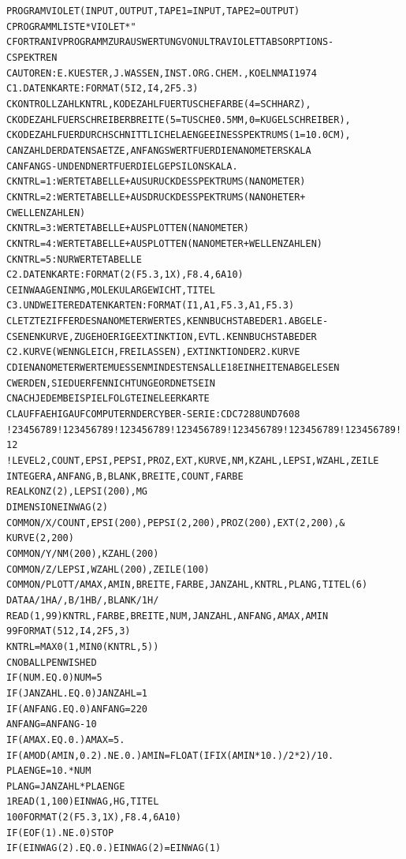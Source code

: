 \documentclass[a4paper,11pt]{article}
\begin{document}
\begin{alltt}
      PROGRAM VIOLET (INPUT,OUTPUT,TAPE1=INPUT,TAPE2=OUTPUT)
C     PROGRAMMLISTE *VIOLET* "
C     FORTRAN IV PROGRAMM ZUR AUSWERTUNG VON ULTRAVIOLETTABSORPTIONS-
C     SPEKTREN
C     AUTOREN: E.KUESTER, J.WASSEN‚ INST.ORG.CHEM.‚ KOELN MAI 1974
C     1. DATENKARTE: FORMAT (5I2,I4,2F5.3)
C      KONTROLLZAHL KNTRL, KODEZAHL FUER TUSCHEFARBE (4=SCHHARZ)‚
C      KODEZAHL FUER SCHREIBERBREITE (5=TUSCHE 0.5 MM, 0=KUGELSCHREIBER)‚
C      KODEZAHL FUER DURCHSCHNITTLICHE LAENGE EINES SPEKTRUMS (1=10.0CM),
C      ANZAHL DER DATENSAETZE, ANFANGSWERT FUER DIE NANOMETERSKALA
C      ANFANGS- UND ENDNERT FUER DIE LG EPSILON SKALA.
C       KNTRL=1: WERTETABELLE + AUSURUCK DES SPEKTRUMS (NANOMETER)
C       KNTRL=2: WERTETABELLE + AUSDRUCK DES SPEKTRUMS (NANOHETER +
C        WELLENZAHLEN)
C       KNTRL=3: WERTETABELLE + AUSPLOTTEN (NANOMETER)
C       KNTRL=4: WERTETABELLE + AUSPLOTTEN (NANOMETER + WELLENZAHLEN)
C       KNTRL=5: NUR WERTETABELLE
C     2. DATENKARTE: FORMAT (2(F5.3‚1X)‚F8.4,6A10)
C      EINWAAGEN IN MG, MOLEKULARGEWICHT, TITEL
C     3. UND WEITERE DATENKARTEN: FORMAT (I1‚A1‚F5.3‚A1‚F5.3)
C      LETZTE ZIFFER DES NANOMETERWERTES, KENNBUCHSTABE DER 1. ABGELE-
C      SENEN KURVE, ZUGEHOERIGE EXTINKTION, EVTL. KENNBUCHSTABE DER
C      2. KURVE (WENN GLEICH‚FREILASSEN)‚ EXTINKTION DER 2. KURVE
C      DIE NANOMETERWERTE MUESSEN MINDESTENS ALLE 18 EINHEITEN ABGELESEN
C      WERDEN, SIE DUERFEN NICHT UNGEORDNET SEIN
C      NACH JEDEM BEISPIEL FOLGT EINE LEERKARTE
C     LAUFFAEHIG AUF COMPUTERN DER CYBER-SERIE: CDC 7288 UND 7608
!23456789!123456789!123456789!123456789!123456789!123456789!123456789!12
!     LEVEL 2,COUNT,EPSI,PEPSI,PROZ,EXT,KURVE,NM,KZAHL,LEPSI,WZAHL,ZEILE
      INTEGER A,ANFANG,B,BLANK,BREITE,COUNT,FARBE
      REAL KONZ(2),LEPSI(200),MG
      DIMENSION EINWAG(2)
      COMMON/X/COUNT,EPSI(200),PEPSI(2,200),PROZ(200),EXT(2,200),&
      KURVE(2,200)
      COMMON/Y/NM(200),KZAHL(200)
      COMMON/Z/LEPSI,WZAHL(200),ZEILE(100)
      COMMON/PLOTT/AMAX,AMIN,BREITE,FARBE,JANZAHL,KNTRL,PLANG,TITEL(6)
      DATA A/1HA/,B/1HB/,BLANK/1H /
      READ (1,99) KNTRL,FARBE,BREITE,NUM,JANZAHL,ANFANG,AMAX,AMIN
   99 FORMAT (512,I4,2F5,3)
      KNTRL = MAX0(1,MIN0(KNTRL,5))
C     NO BALLPEN WISHED
      IF (NUM.EQ.0) NUM = 5
      IF (JANZAHL.EQ.0) JANZAHL = 1
      IF (ANFANG.EQ.0) ANFANG = 220
      ANFANG = ANFANG - 10
      IF (AMAX.EQ.0.) AMAX = 5.
      IF (AMOD(AMIN,0.2).NE.0.) AMIN = FLOAT(IFIX(AMIN*10.)/2*2)/10.
      PLAENGE = 10. * NUM
      PLANG = JANZAHL*PLAENGE
    1 READ (1,100) EINWAG, HG, TITEL
  100 FORMAT (2(F5.3,1X),F8.4,6A10)
      IF (EOF(1).NE.0) STOP
      IF (EINWAG(2).EQ.0.) EINWAG(2) = EINWAG(1)
\newpage
{}



\end{alltt}
\end{document}
